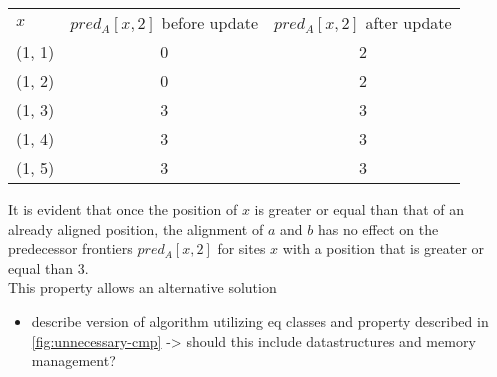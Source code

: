 \begin{table}[h]
	\centering
	\begin{tabular}{l c c}
		$x$ & $pred_A[x, 2]$ before update &  $pred_A[x, 2]$ after update\\
		(1, 1) & 0 & 2 \\
		(1, 2) & 0 & 2 \\
		(1, 3) & 3 & 3 \\
		(1, 4) & 3 & 3 \\
		(1, 5) & 3 & 3 \\
	\end{tabular}
	\label{}
\end{table}

It is evident that once the position of $x$ is greater or equal than that of an already aligned position, the alignment of $a$ and $b$ has no effect on the predecessor frontiers $pred_A[x, 2]$ for sites $x$ with a position that is greater or equal than $3$.\\
This property allows an alternative solution 

\begin{itemize}
	\item describe version of algorithm utilizing eq classes and property described in \ref{fig:unnecessary-cmp} -> should this include datastructures and memory management?
\end{itemize}
